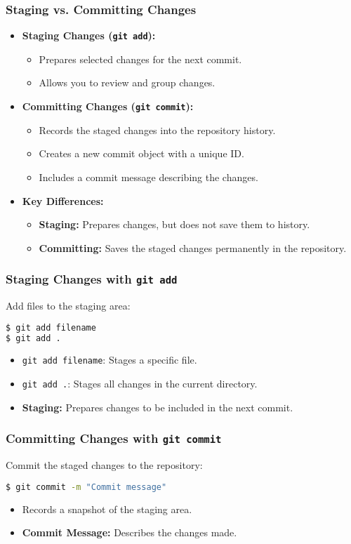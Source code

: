 \documentclass{beamer}
\begin{document}
\begin{frame}
  \frametitle{Staging vs. Committing Changes}
  \begin{itemize}
    \item \textbf{Staging Changes (\texttt{git add}):}
      \begin{itemize}
        \item Prepares selected changes for the next commit.
        \item Allows you to review and group changes.
      \end{itemize}
    \item \textbf{Committing Changes (\texttt{git commit}):}
      \begin{itemize}
        \item Records the staged changes into the repository history.
        \item Creates a new commit object with a unique ID.
        \item Includes a commit message describing the changes.
      \end{itemize}
    \item \textbf{Key Differences:}
      \begin{itemize}
        \item \textbf{Staging:} Prepares changes, but does not save them to history.
        \item \textbf{Committing:} Saves the staged changes permanently in the repository.
      \end{itemize}
  \end{itemize}
\end{frame}

\begin{frame}[fragile]
  \frametitle{Staging Changes with \texttt{git add}}
  Add files to the staging area:
  \begin{lstlisting}[language=bash]
$ git add filename
$ git add .
  \end{lstlisting}
  \begin{itemize}
    \item \texttt{git add filename}: Stages a specific file.
    \item \texttt{git add .}: Stages all changes in the current directory.
    \item \textbf{Staging:} Prepares changes to be included in the next commit.
  \end{itemize}
\end{frame}

\begin{frame}[fragile]
  \frametitle{Committing Changes with \texttt{git commit}}
  Commit the staged changes to the repository:
  \begin{lstlisting}[language=bash]
$ git commit -m "Commit message"
  \end{lstlisting}
  \begin{itemize}
    \item Records a snapshot of the staging area.
    \item \textbf{Commit Message:} Describes the changes made.
  \end{itemize}
\end{frame}
\end{document}
